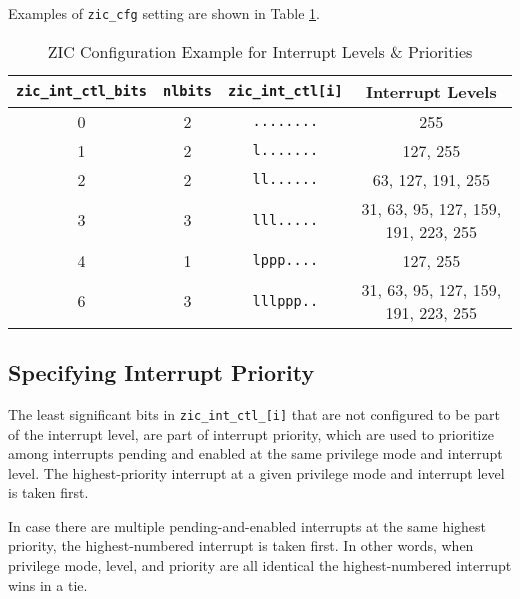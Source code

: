 Examples of \texttt{zic\_cfg} setting are shown in Table \ref{tab:zic-cfg-examples}.

\vspace{1.25cm}
\begin{table}[H]
    \centering
    \caption{ZIC Configuration Example for Interrupt Levels \& Priorities}
    \label{tab:zic-cfg-examples}
    \vspace{0.75cm}
    \begin{tabular}{|c|c|c|c|}
    \hline
        \textbf{\texttt{zic\_int\_ctl\_bits\footnotemark}} & \textbf{\texttt{nlbits}} & \textbf{\texttt{zic\_int\_ctl[i]}} & \textbf{Interrupt Levels}\\ \hline \hline
         0 & 2 & \texttt{........} & 255 \\ \hline
         1 & 2 & \texttt{l.......} & 127, 255 \\ \hline
         2 & 2 & \texttt{ll......} & 63, 127, 191, 255  \\ \hline
         3 & 3 & \texttt{lll.....} & 31, 63, 95, 127, 159, 191, 223, 255 \\ \hline
         4 & 1 & \texttt{lppp....} & 127, 255 \\ \hline
         6 & 3 & \texttt{lllppp..} & 31, 63, 95, 127, 159, 191, 223, 255 \\ \hline
    \end{tabular}
\end{table}
\vspace{0.25cm}


\subsection{Specifying Interrupt Priority}

The least significant bits in \texttt{zic\_int\_ctl\_[i]} that are not configured to be part of the interrupt level, are part of interrupt priority, which are used to prioritize among interrupts pending and enabled at the same privilege mode and interrupt level. The highest-priority interrupt at a given privilege mode and interrupt level is taken first. 

In case there are multiple pending-and-enabled interrupts at the same highest priority, the highest-numbered interrupt is taken first. In other words, when privilege mode, level, and priority are all identical the highest-numbered interrupt wins in a tie.

